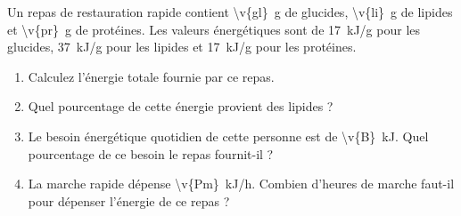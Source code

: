 Un repas de restauration rapide contient \qty{\v{gl}}{g} de glucides, \qty{\v{li}}{g} de lipides et \qty{\v{pr}}{g} de protéines. Les valeurs énergétiques sont de \qty{17}{kJ/g} pour les glucides, \qty{37}{kJ/g} pour les lipides et \qty{17}{kJ/g} pour les protéines.

\begin{enumerate}[label=\alph*)]
    \item Calculez l'énergie totale fournie par ce repas.
    \item Quel pourcentage de cette énergie provient des lipides ?
    \item Le besoin énergétique quotidien de cette personne est de \qty{\v{B}}{kJ}. Quel pourcentage de ce besoin le repas fournit-il ?
    \item La marche rapide dépense \qty{\v{Pm}}{kJ/h}. Combien d'heures de marche faut-il pour dépenser l'énergie de ce repas ?
\end{enumerate}
